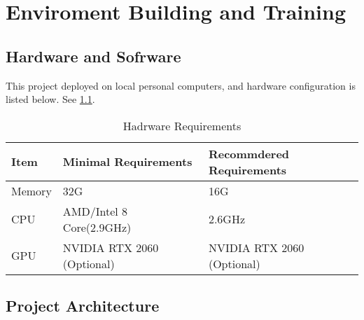 
\chapter{Enviroment Building and Training} %

\label{Chapter3} %


\section{Hardware and Sofrware}
This project deployed on local personal computers, and hardware configuration is listed below. See \ref{tab:hardware}.
\begin{table}[H]
\begin{tabular}{l l l}
\toprule
\textbf{Item} & \textbf{Minimal Requirements} & \textbf{Recommdered Requirements} \\
\midrule
Memory & 32G & 16G  \\
CPU & AMD/Intel 8 Core(2.9GHz) & 2.6GHz \\
GPU& NVIDIA RTX 2060 (Optional) & NVIDIA RTX 2060 (Optional) \\
\bottomrule
\end{tabular}
\caption{Hadrware Requirements}
\label{tab:hardware}
\end{table}

\section{Project Architecture}

